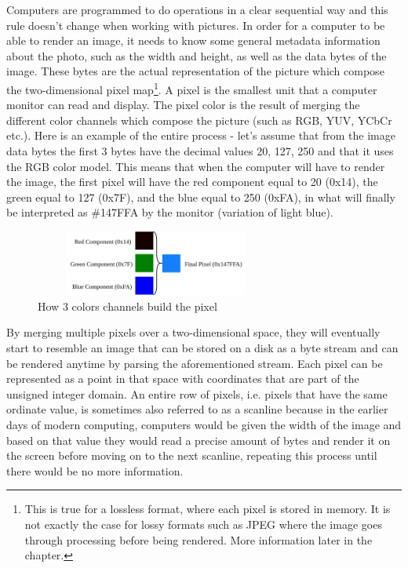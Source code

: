 \begin{multicols}{2}
Computers are programmed to do operations in a clear sequential way and this rule doesn't change when working with pictures. In order for a computer to be able to render an image, it needs to know some general metadata information about the photo, such as the width and height, as well as the data bytes of the image. These bytes are the actual representation of the picture which compose the two-dimensional pixel map\footnote{This is true for a lossless format, where each pixel is stored in memory. It is not exactly the case for lossy formats such as JPEG where the image goes through processing before being rendered. More information later in the chapter.}. A pixel is the smallest unit that a computer monitor can read and display. The pixel color is the result of merging the different color channels which compose the picture (such as RGB, YUV, YCbCr etc.). Here is an example of the entire process - let's assume that from the image data bytes the first 3 bytes have the decimal values 20, 127, 250 and that it uses the RGB color model. This means that when the computer will have to render the image, the first pixel will have the red component equal to 20 (0x14), the green equal to 127 (0x7F), and the blue equal to 250 (0xFA), in what will finally be interpreted as \#147FFA by the monitor (variation of light blue). 

\begin{figure}[H]
    \centering
    \includegraphics[width=8cm,height=2.15cm,keepaspectratio]{pics/how_a_pixel_works}
    \caption{How 3 colors channels build the pixel}
    \label{Pixel Creation}
\end{figure}

By merging multiple pixels over a two-dimensional space, they will eventually start to resemble an image that can be stored on a disk as a byte stream and can be rendered anytime by parsing the aforementioned stream. Each pixel can be represented as a point in that space with coordinates that are part of the unsigned integer domain. An entire row of pixels, i.e. pixels that have the same ordinate value, is sometimes also referred to as a scanline because in the earlier days of modern computing, computers would be given the width of the image and based on that value they would read a precise amount of bytes and render it on the screen before moving on to the next scanline, repeating this process until there would be no more information.


\end{multicols}
